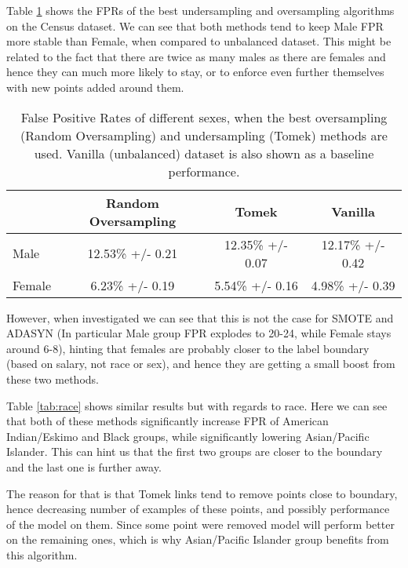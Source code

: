 \documentclass{article}
\begin{document}
Table \ref{tab:sex} shows the FPRs of the best undersampling and oversampling algorithms on the Census dataset. We can see that both methods tend to keep Male FPR more stable than Female, when compared to unbalanced dataset. This might be related to the fact that there are twice as many males as there are females and hence they can much more likely to stay, or to enforce even further themselves with new points added around them.

\begin{table}[h]
	\centering
	\begin{tabular}{|l|c|c|c|}
	\hline
	 & Random Oversampling & Tomek & Vanilla \\
	\hline
	Male & 12.53\% +/- 0.21
	& 12.35\% +/- 0.07 & 12.17\% +/- 0.42 \\
	\hline
	Female & 6.23\% +/- 0.19 & 5.54\% +/- 0.16 & 4.98\% +/- 0.39 \\
	\hline
	\end{tabular}
	\caption{False Positive Rates of different sexes, when the best oversampling (Random Oversampling) and undersampling (Tomek) methods are used. Vanilla (unbalanced) dataset is also shown as a baseline performance.}
	\label{tab:sex}
\end{table}

However, when investigated we can see that this is not the case for SMOTE and ADASYN (In particular Male group FPR explodes to 20-24, while Female stays around 6-8), hinting that females are probably closer to the label boundary (based on salary, not race or sex), and hence they are getting a small boost from these two methods.

Table \ref{tab:race} shows similar results but with regards to race. Here we can see that both of these methods significantly increase FPR of American Indian/Eskimo and Black groups, while significantly lowering Asian/Pacific Islander. This can hint us that the first two groups are closer to the boundary and the last one is further away.

The reason for that is that Tomek links tend to remove points close to boundary, hence decreasing number of examples of these points, and possibly performance of the model on them. Since some point were removed model will perform better on the remaining ones, which is why Asian/Pacific Islander group benefits from this algorithm.
\end{document}
